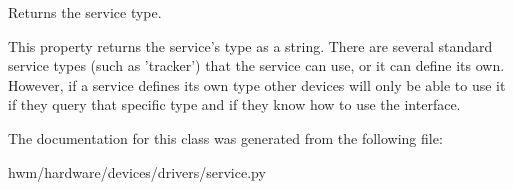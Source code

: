 Returns the service type. 

This property returns the service's type as a string. There are several standard service types (such as 'tracker') that the service can use, or it can define its own. However, if a service defines its own type other devices will only be able to use it if they query that specific type and if they know how to use the interface. 

The documentation for this class was generated from the following file\-:\begin{DoxyCompactItemize}
\item 
hwm/hardware/devices/drivers/service.\-py\end{DoxyCompactItemize}

